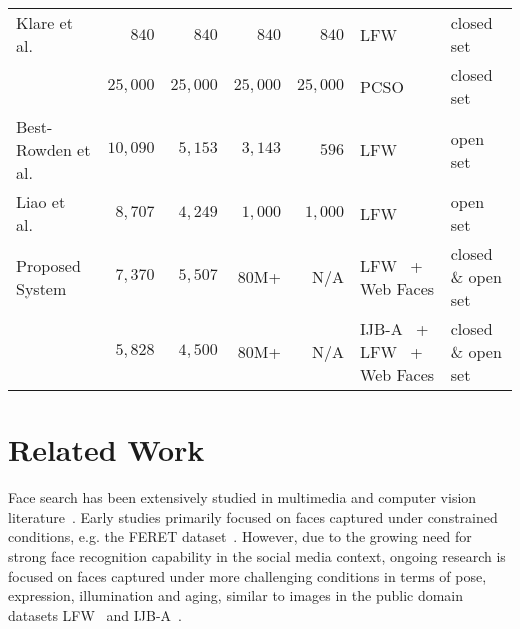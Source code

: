 \documentclass[10pt,journal,compsoc]{IEEEtran}
\begin{document}
\begin{table*}[htbp]
\begin{minipage}{\textwidth}
\begin{tabular}{lrrrrll}
Klare et al.~\cite{fr:cots_cluster}       & $840$    & $840$& $840$       &$840$    & LFW~\cite{DB:LFWTech} & closed set\\
                                          & $25,000$ & $25,000$ & $25,000$ & $25,000$ & PCSO~\cite{fr:cots_cluster} & closed set\\
Best-Rowden et al.~\cite{faceretrieval:fusion} & $10,090$ & $5,153$ & $3,143$ & $596$   & LFW~\cite{DB:LFWTech} & open set \\
Liao et al.~\cite{BLUFR}                       & $8,707$  & $4,249$ & $1,000$ & $1,000$ & LFW~\cite{DB:LFWTech} & open set \\
\midrule
Proposed System & $7,370$ & $5,507$ & $80$M+ & N/A &  LFW~\cite{DB:LFWTech} + Web Faces & closed \& open set\\
                & $5,828$ & $4,500$ & $80$M+ & N/A &  IJB-A~\cite{db:janus} + LFW~\cite{DB:LFWTech} + Web Faces & closed \& open set\\
\bottomrule
\end{tabular}
\end{minipage}
\end{table*}

\section{Related Work}
Face search has been extensively studied in multimedia and computer vision literature~\cite{book:HBforFR2011}. Early studies primarily focused on faces captured under constrained conditions, e.g. the FERET dataset~\cite{db:FERET}. However,
due to the growing need for strong face recognition capability in the social media context, ongoing research is focused on faces captured under more challenging conditions in terms of pose, expression, illumination and aging, similar to images in the public domain datasets LFW~\cite{DB:LFWTech} and IJB-A~\cite{db:janus}.
\end{document}
